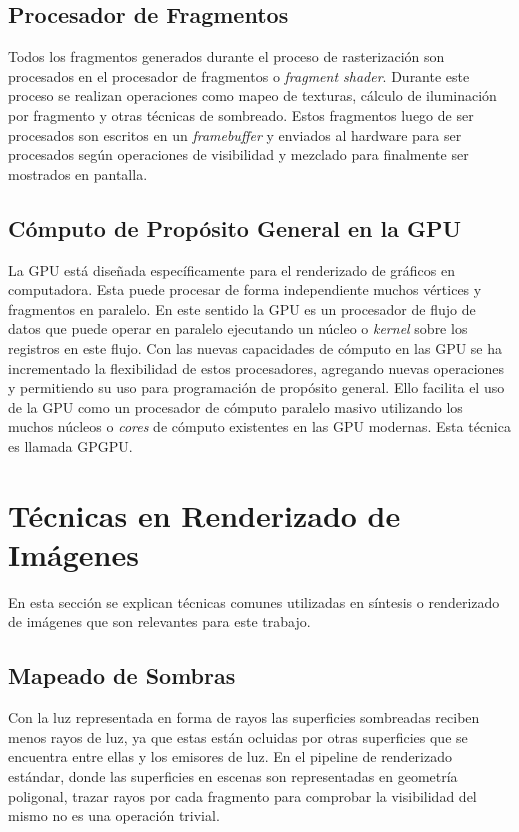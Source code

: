 \subsection{Procesador de Fragmentos}
Todos los fragmentos generados durante el proceso de rasterización son procesados en el procesador de fragmentos o \emph{fragment shader}. Durante este proceso se realizan operaciones como mapeo de texturas, cálculo de iluminación por fragmento y otras técnicas de sombreado. Estos fragmentos luego de ser procesados son escritos en un \emph{framebuffer} y enviados al hardware para ser procesados según operaciones de visibilidad y mezclado para finalmente ser mostrados en pantalla.
\subsection{Cómputo de Propósito General en la GPU}
La \ac{GPU} está diseñada específicamente para el renderizado de gráficos en computadora. Esta puede procesar de forma independiente muchos vértices y fragmentos en paralelo. En este sentido la \ac{GPU} es un procesador de flujo de datos que puede operar en paralelo ejecutando un núcleo o \emph{kernel} sobre los registros en este flujo. Con las nuevas capacidades de cómputo en las GPU se ha incrementado la flexibilidad de estos procesadores, agregando nuevas operaciones y permitiendo su uso para programación de propósito general. Ello facilita el uso de la GPU como un procesador de cómputo paralelo masivo utilizando los muchos núcleos o \emph{cores} de cómputo existentes en las GPU modernas. Esta técnica es llamada \ac{GPGPU}.

\section{Técnicas en Renderizado de Imágenes}

En esta sección se explican técnicas comunes utilizadas en síntesis o renderizado de imágenes que son relevantes para este trabajo.

\subsection{Mapeado de Sombras}
\label{subsec:shadowmapping}
Con la luz representada en forma de rayos las superficies sombreadas reciben menos rayos de luz, ya que estas están ocluidas por otras superficies que se encuentra entre ellas y los emisores de luz. En el pipeline de renderizado estándar, donde las superficies en escenas son representadas en geometría poligonal, trazar rayos por cada fragmento para comprobar la visibilidad del mismo no es una operación trivial.

